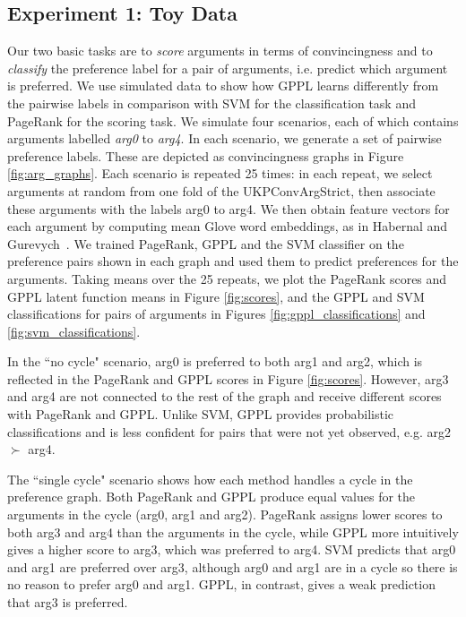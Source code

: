 \subsection{Experiment 1: Toy Data}

Our two basic tasks are to \emph{score} arguments in terms of convincingness and to 
\emph{classify} the preference label for a pair of arguments, i.e. predict which argument is preferred. 
We use simulated data to show how GPPL learns differently from the pairwise labels 
in comparison with SVM for the classification task and PageRank for the scoring task.
We simulate four scenarios, each of which contains arguments labelled \emph{arg0} to \emph{arg4}.  
In each scenario, we generate a set of pairwise preference labels. 
These are depicted as convincingness graphs in Figure \ref{fig:arg_graphs}.
Each scenario is repeated 25 times: in each repeat, we select arguments at random from one fold of the UKPConvArgStrict, 
then associate these arguments with the labels arg0 to arg4. 
We then obtain feature vectors for each argument by computing mean Glove word embeddings, as in Habernal and 
Gurevych~.
We trained PageRank, GPPL and the SVM classifier on the preference pairs shown in each graph and
used them to predict preferences for the arguments.
Taking means over the 25 repeats, 
we plot the PageRank scores and GPPL latent function means in Figure \ref{fig:scores},  
and the GPPL and SVM classifications for pairs of arguments  in 
Figures \ref{fig:gppl_classifications} and \ref{fig:svm_classifications}.

In the  ``no cycle" scenario, 
arg0 is preferred to both arg1 and arg2, which is reflected in the PageRank and GPPL scores in Figure \ref{fig:scores}. However, arg3 and arg4 are not connected to the rest of the graph and receive different scores with PageRank and GPPL. 
Unlike SVM, GPPL provides probabilistic classifications and is less confident for pairs that were not yet observed, 
e.g. arg2 $\succ$ arg4.

The ``single cycle" scenario shows how each method handles a cycle in the preference graph.
Both PageRank and GPPL produce equal values for the arguments in the cycle (arg0, arg1 and arg2). PageRank assigns lower scores to both arg3 and arg4 than the arguments in the cycle, 
while GPPL more intuitively gives a higher score to arg3, which was preferred to arg4. 
SVM predicts that arg0 and arg1 are preferred over arg3, 
although arg0 and arg1 are in a cycle so there is no reason to prefer arg0 and arg1. 
GPPL, in contrast, gives a weak prediction that arg3 is preferred.

